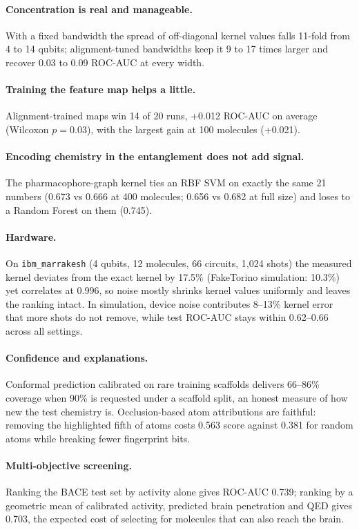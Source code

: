\documentclass[11pt]{article}
\begin{document}
\paragraph{Concentration is real and manageable.} With a fixed bandwidth the spread of
off-diagonal kernel values falls 11-fold from 4 to 14 qubits; alignment-tuned bandwidths keep it
9 to 17 times larger and recover 0.03 to 0.09 ROC-AUC at every width.

\paragraph{Training the feature map helps a little.} Alignment-trained maps win 14 of 20 runs,
+0.012 ROC-AUC on average (Wilcoxon $p=0.03$), with the largest gain at 100 molecules (+0.021).

\paragraph{Encoding chemistry in the entanglement does not add signal.} The pharmacophore-graph
kernel ties an RBF SVM on exactly the same 21 numbers (0.673 vs 0.666 at 400 molecules; 0.656 vs
0.682 at full size) and loses to a Random Forest on them (0.745).

\paragraph{Hardware.} On \texttt{ibm\_marrakesh} (4 qubits, 12 molecules, 66 circuits, 1{,}024
shots) the measured kernel deviates from the exact kernel by 17.5\% (FakeTorino simulation:
10.3\%) yet correlates at 0.996, so noise mostly shrinks kernel values uniformly and leaves the
ranking intact. In simulation, device noise contributes 8--13\% kernel error that more shots do
not remove, while test ROC-AUC stays within 0.62--0.66 across all settings.

\paragraph{Confidence and explanations.} Conformal prediction calibrated on rare training
scaffolds delivers 66--86\% coverage when 90\% is requested under a scaffold split, an honest
measure of how new the test chemistry is. Occlusion-based atom attributions are faithful:
removing the highlighted fifth of atoms costs 0.563 score against 0.381 for random atoms while
breaking fewer fingerprint bits.

\paragraph{Multi-objective screening.} Ranking the BACE test set by activity alone gives ROC-AUC
0.739; ranking by a geometric mean of calibrated activity, predicted brain penetration and QED
gives 0.703, the expected cost of selecting for molecules that can also reach the brain.
\end{document}
